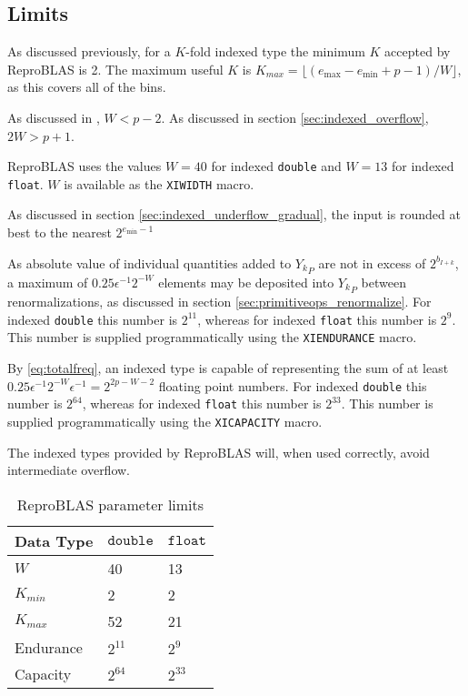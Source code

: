\subsection{Limits}
    \label{sec:primitiveops_limits}
    As discussed previously, for a $K$-fold indexed type the minimum $K$
    accepted by ReproBLAS is 2. The maximum useful $K$ is
    $K_{max}=\lfloor(e_{\max} - e_{\min} + p - 1)/W\rfloor$,
    as this covers all of the bins.

    As discussed in \cite{repsum}, $W < p - 2$. As discussed in section
    \ref{sec:indexed_overflow}, $2 W > p + 1$.

    ReproBLAS uses the values $W = 40$ for indexed \texttt{double} and $W = 13$
    for indexed \texttt{float}. $W$ is available as the \texttt{XIWIDTH} macro.

    As discussed in section \ref{sec:indexed_underflow_gradual}, the input is
    rounded at best to the nearest $2^{e_{\min} - 1}$

    As absolute value of individual quantities added to ${Y_k}_P$ are not in
    excess of $2^{b_{I + k}}$, a maximum of $0.25\epsilon^{-1}2^{-W}$ elements
    may be deposited into ${Y_k}_P$ between renormalizations, as discussed in
    section \ref{sec:primitiveops_renormalize}. For indexed \texttt{double}
    this number is $2^{11}$, whereas for indexed \texttt{float} this number is
    $2^9$. This number is supplied programmatically using the
    \texttt{XIENDURANCE} macro.

    By \eqref{eq:totalfreq}, an indexed type is capable of representing the sum
    of at least $0.25\epsilon^{-1}2^{-W}  \epsilon^{-1} = 2^{2  p - W - 2}$
    floating point numbers. For indexed \texttt{double} this number is
    $2^{64}$, whereas for indexed \texttt{float} this number is
    $2^{33}$. This number is supplied programmatically using the
    \texttt{XICAPACITY} macro.

    The indexed types provided by ReproBLAS will, when used correctly, avoid intermediate overflow.

    \begin{table}
        \caption{ReproBLAS parameter limits}
        \begin{tabular}{l | l | l}
            Data Type & $\texttt{double}$ & $\texttt{float}$ \\ \hline
            $W$ & 40 & 13 \\ \hline
            $K_{min}$ & 2 & 2 \\ \hline
            $K_{max}$ & 52 & 21 \\ \hline
            Endurance & $2^{11}$ & $2^9$ \\ \hline
            Capacity & $2^{64}$ & $2^{33}$ \\ \hline
        \end{tabular}
    \end{table}
